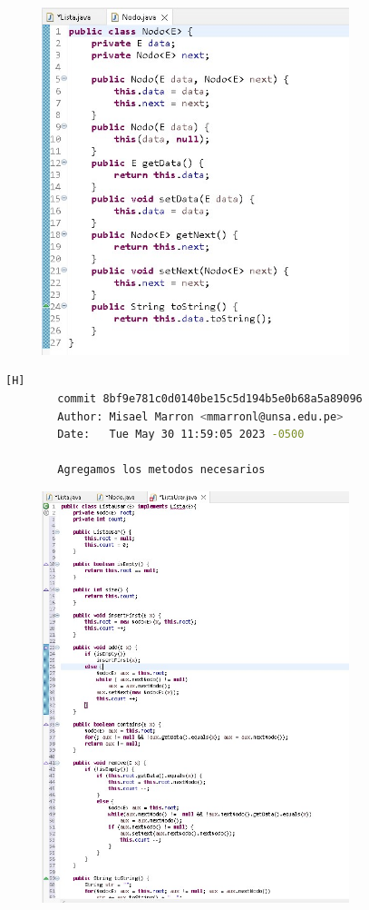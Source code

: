 \documentclass{article}
\begin{document}
	\begin{figure}[H]
		\centering
		\includegraphics[width=0.8\textwidth,keepaspectratio]{img/codigo2b.jpg}	
	\end{figure}
		
	 \begin{lstlisting}[language=bash,caption={Mi tercer commit mas importante es cuando agregue ListaUsar y complete con metodos.}][H]
		commit 8bf9e781c0d0140be15c5d194b5e0b68a5a89096
		Author: Misael Marron <mmarronl@unsa.edu.pe>
		Date:   Tue May 30 11:59:05 2023 -0500

   		Agregamos los metodos necesarios
	\end{lstlisting}
	
	\begin{figure}[H]
		\centering
		\includegraphics[width=0.8\textwidth,keepaspectratio]{img/codigo3.jpg}	
	\end{figure}
	
\end{document}
